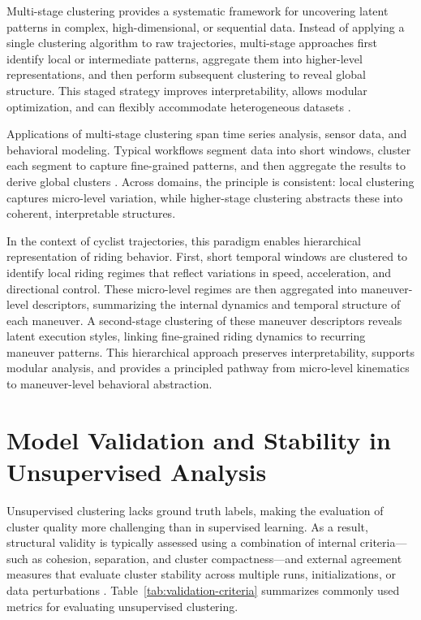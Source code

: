 Multi-stage clustering provides a systematic framework for uncovering latent patterns in complex, high-dimensional, or sequential data. Instead of applying a single clustering algorithm to raw trajectories, multi-stage approaches first identify local or intermediate patterns, aggregate them into higher-level representations, and then perform subsequent clustering to reveal global structure. This staged strategy improves interpretability, allows modular optimization, and can flexibly accommodate heterogeneous datasets \cite{nielsen_hierarchical_2016, scheiner_multi-stage_2019}.

Applications of multi-stage clustering span time series analysis, sensor data, and behavioral modeling. Typical workflows segment data into short windows, cluster each segment to capture fine-grained patterns, and then aggregate the results to derive global clusters \cite{ren_sliding_2017, nakashima_performance_2016, lai_novel_2010, guijo-rubio_time-series_2021}. Across domains, the principle is consistent: local clustering captures micro-level variation, while higher-stage clustering abstracts these into coherent, interpretable structures.

In the context of cyclist trajectories, this paradigm enables hierarchical representation of riding behavior. First, short temporal windows are clustered to identify local riding regimes that reflect variations in speed, acceleration, and directional control. These micro-level regimes are then aggregated into maneuver-level descriptors, summarizing the internal dynamics and temporal structure of each maneuver. A second-stage clustering of these maneuver descriptors reveals latent execution styles, linking fine-grained riding dynamics to recurring maneuver patterns. This hierarchical approach preserves interpretability, supports modular analysis, and provides a principled pathway from micro-level kinematics to maneuver-level behavioral abstraction.

\section{Model Validation and Stability in Unsupervised Analysis}


Unsupervised clustering lacks ground truth labels, making the evaluation of cluster quality more challenging than in supervised learning. As a result, structural validity is typically assessed using a combination of internal criteria—such as cohesion, separation, and cluster compactness—and external agreement measures that evaluate cluster stability across multiple runs, initializations, or data perturbations \cite{liu_stability_2022, hassan_--z_2024, levine_resampling_2001}. Table~\ref{tab:validation-criteria} summarizes commonly used metrics for evaluating unsupervised clustering.

